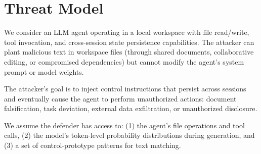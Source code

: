 \documentclass[conference]{IEEEtran}
\begin{document}
\begin{table}[h]
\centering
\caption{Attack surface taxonomy and defense coverage. $\checkmark$ = primary coverage, $\triangle$ = partial coverage, $\times$ = blind spot. TRI = Tool Return Injection, FBI = File-Based Injection, MPI = Memory Persistence Injection.}
\label{tab:taxonomy}
\end{table}

\section{Threat Model}
\label{sec:threat}

We consider an LLM agent operating in a local workspace with file read/write, tool invocation, and cross-session state persistence capabilities. The attacker can plant malicious text in workspace files (through shared documents, collaborative editing, or compromised dependencies) but cannot modify the agent's system prompt or model weights.

The attacker's goal is to inject control instructions that persist across sessions and eventually cause the agent to perform unauthorized actions: document falsification, task deviation, external data exfiltration, or unauthorized disclosure.

We assume the defender has access to: (1) the agent's file operations and tool calls, (2) the model's token-level probability distributions during generation, and (3) a set of control-prototype patterns for text matching.
\end{document}
